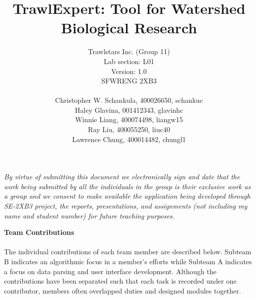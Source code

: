 \documentclass{article}
\begin{document}
\title{\textbf{TrawlExpert: Tool for Watershed Biological Research}}
\author{Trawlstars Inc. (Group 11) \\ Lab section: L01  \\ Version: 1.0 \\ SFWRENG 2XB3 \\ \\ Christopher W. Schankula, 400026650, schankuc \\ Haley Glavina, 001412343, glavinhc \\ Winnie Liang, 400074498, liangw15 \\ Ray Liu, 400055250, liuc40 \\ Lawrence Chung, 400014482, chungl1}

\maketitle

\newpage

\begin{versionhistory}
\end{versionhistory} 

\noindent\textit{By virtue of submitting this document we electronically sign and date that the work being submitted by all the individuals in the group is their exclusive work as a group and we consent to make available the application being developed through SE-2XB3 project, the reports, presentations, and assignments (not including my name and student number) for future teaching purposes.}

\newpage

\textbf{\Large{Team Contributions}}\\ \\
The individual contributions of each team member are described below. Subteam B indicates an algorithmic focus in a member's efforts while Subteam A indicates a focus on data parsing and user interface development. Although the contributions have been separated such that each task is recorded under one contributor, members often overlapped duties and designed modules together. \\
\end{document}
